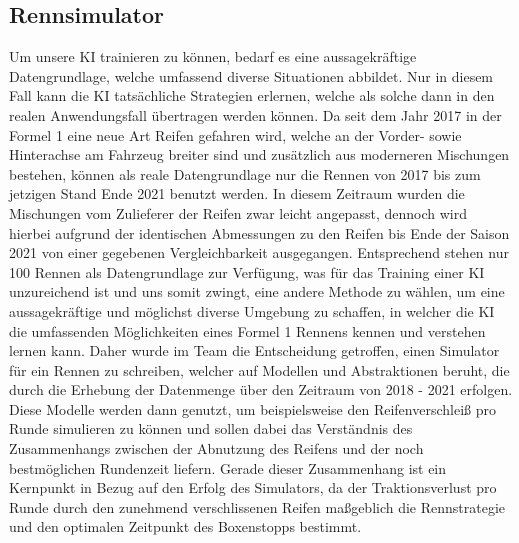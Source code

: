 \subsection{Rennsimulator}
Um unsere KI trainieren zu können, bedarf es eine aussagekräftige Datengrundlage, welche umfassend diverse Situationen abbildet. Nur in diesem Fall kann die KI tatsächliche Strategien erlernen, welche als solche dann in den realen Anwendungsfall übertragen werden können. Da seit dem Jahr 2017 in der Formel 1 eine neue Art Reifen gefahren wird, welche an der Vorder- sowie Hinterachse am Fahrzeug breiter sind und zusätzlich aus moderneren Mischungen bestehen, können als reale Datengrundlage nur die Rennen von 2017 bis zum jetzigen Stand Ende 2021 benutzt werden. In diesem Zeitraum wurden die Mischungen vom Zulieferer der Reifen zwar leicht angepasst, dennoch wird hierbei aufgrund der identischen Abmessungen zu den Reifen bis Ende der Saison 2021 von einer gegebenen Vergleichbarkeit ausgegangen. Entsprechend stehen nur 100 Rennen als Datengrundlage zur Verfügung, was für das Training einer KI unzureichend ist und uns somit zwingt, eine andere Methode zu wählen, um eine aussagekräftige und möglichst diverse Umgebung zu schaffen, in welcher die KI die umfassenden Möglichkeiten eines Formel 1 Rennens kennen und verstehen lernen kann. Daher wurde im Team die Entscheidung getroffen, einen Simulator für ein Rennen zu schreiben, welcher auf Modellen und Abstraktionen beruht, die durch die Erhebung der Datenmenge über den Zeitraum von 2018 - 2021 erfolgen. Diese Modelle werden dann genutzt, um beispielsweise den Reifenverschleiß pro Runde simulieren zu können und sollen dabei das Verständnis des Zusammenhangs zwischen der Abnutzung des Reifens und der noch bestmöglichen Rundenzeit liefern. Gerade dieser Zusammenhang ist ein Kernpunkt in Bezug auf den Erfolg des Simulators, da der Traktionsverlust pro Runde durch den zunehmend verschlissenen Reifen maßgeblich die Rennstrategie und den optimalen Zeitpunkt des Boxenstopps bestimmt.


